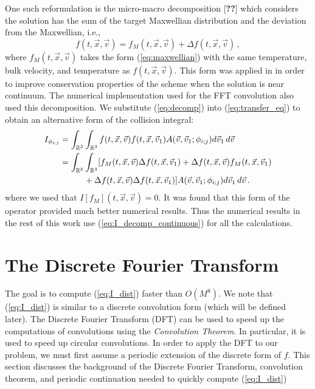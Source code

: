 \documentclass[12pt]{CSUNthesis}
\def\R{\mathbb{R}}
\def\R{\mathbb{R}}
\newcommand{\vecx}{\vec{x}}
\newcommand{\vecv}{\vec{v}}
\begin{document}
One such reformulation is the micro-macro decomposition [{\bf ??}] which considers the solution has the sum of the target Maxwellian distribution and the deviation from the Maxwellian, i.e.,
\begin{equation}
\label{eq:decomp}
f(t,\vecx,\vecv) = f_M(t, \vecx, \vecv) + \Delta f(t,\vecx,\vecv)\, ,
\end{equation}
where $f_M(t,\vecx,\vecv)$ takes the form (\ref{eq:maxwellian}) with the same temperature, bulk velocity, and temperature as $f(t,\vecx,\vecv)$. This form was applied in \cite{AlekseenkoJosyula2012} in order to improve conservation properties of the scheme when the solution is near continuum. The numerical implementation used for the FFT convolution also used this decomposition. We substitute (\ref{eq:decomp}) into (\ref{eq:transfer_eq}) to obtain an alternative form of the collision integral:
\begin{align}
\label{eq:I_decomp_continuous}
I_{\phi_{i;j}}&= \int_{\R^3}\int_{\R^3} f(t,\vec{x},\vec{v}) f(t,\vec{x},\vec{v}_{1})
 A(\vec{v},\vec{v}_{1};\phi_{i;j})   d\vec{v}_{1}\, d\vec{v}\, \nonumber \\
 &=\int_{\R^3}\int_{\R^3} [f_{M}(t,\vec{x},\vec{v}) \Delta f(t,\vec{x},\vec{v}_{1})
 +\Delta f(t,\vec{x},\vec{v}) f_{M}(t,\vec{x},\vec{v}_{1})\nonumber \\
 &\hspace*{10mm}{}+ \Delta f(t,\vec{x},\vec{v}) \Delta f(t,\vec{x},\vec{v}_{1})]
 A(\vec{v},\vec{v}_{1};\phi_{i;j})   d\vec{v}_{1}\, d\vec{v}\, . 
\end{align}
where we used that $I[f_M](t,\vecx,\vecv)=0$. It was found that this form of the operator provided much better numerical results. Thus the numerical results in the rest of this work use (\ref{eq:I_decomp_continuous}) for all the calculations. 


\chapter{The Discrete Fourier Transform}

The goal is to compute (\ref{eq:I_dist}) faster than $O(M^8)$. We note that (\ref{eq:I_dist}) is similar to a discrete convolution form (which will be defined later). The Discrete Fourier Transform (DFT) can be used to speed up the computations of convolutions using the \textit{Convolution Theorem}. In particular, it is used to speed up circular convolutions. In order to apply the DFT to our problem, we must first assume a periodic extension of the discrete form of $f$. This section discusses the background of the Discrete Fourier Transform, convolution theorem, and periodic continuation needed to quickly compute (\ref{eq:I_dist}) 
\end{document}
